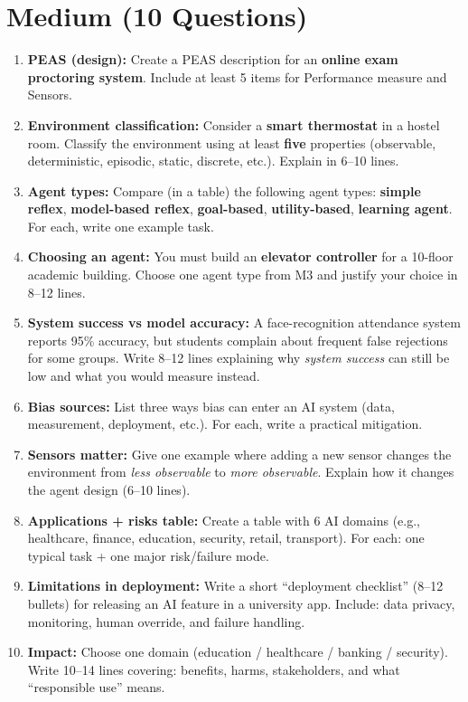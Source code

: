 \documentclass[11pt,a4paper]{article}
\begin{document}
\section*{Medium (10 Questions)}
\begin{enumerate}[label=M\arabic*., leftmargin=*]
  \item \textbf{PEAS (design):} Create a PEAS description for an \textbf{online exam proctoring system}.
    Include at least 5 items for Performance measure and Sensors.

  \item \textbf{Environment classification:} Consider a \textbf{smart thermostat} in a hostel room.
    Classify the environment using at least \textbf{five} properties (observable, deterministic, episodic, static, discrete, etc.).
    Explain in 6--10 lines.

  \item \textbf{Agent types:} Compare (in a table) the following agent types:
    \textbf{simple reflex}, \textbf{model-based reflex}, \textbf{goal-based}, \textbf{utility-based}, \textbf{learning agent}.
    For each, write one example task.

  \item \textbf{Choosing an agent:} You must build an \textbf{elevator controller} for a 10-floor academic building.
    Choose one agent type from M3 and justify your choice in 8--12 lines.

  \item \textbf{System success vs model accuracy:} A face-recognition attendance system reports 95\% accuracy,
    but students complain about frequent false rejections for some groups.
    Write 8--12 lines explaining why \emph{system success} can still be low and what you would measure instead.

  \item \textbf{Bias sources:} List three ways bias can enter an AI system (data, measurement, deployment, etc.).
    For each, write a practical mitigation.

  \item \textbf{Sensors matter:} Give one example where adding a new sensor changes the environment from \emph{less observable} to \emph{more observable}.
    Explain how it changes the agent design (6--10 lines).

  \item \textbf{Applications + risks table:} Create a table with 6 AI domains (e.g., healthcare, finance, education, security, retail, transport).
    For each: one typical task + one major risk/failure mode.

  \item \textbf{Limitations in deployment:} Write a short ``deployment checklist'' (8--12 bullets) for releasing an AI feature in a university app.
    Include: data privacy, monitoring, human override, and failure handling.

  \item \textbf{Impact:} Choose one domain (education / healthcare / banking / security).
    Write 10--14 lines covering: benefits, harms, stakeholders, and what ``responsible use'' means.
\end{enumerate}
\end{document}
